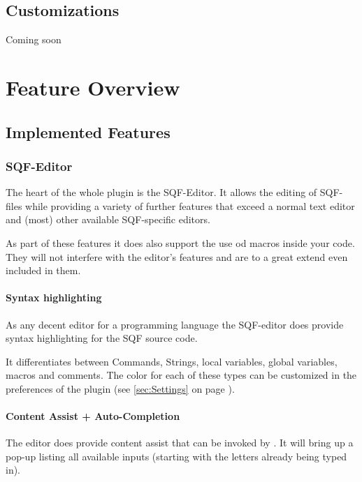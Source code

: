 \documentclass[twoside=false]{scrbook}
\begin{document}
	
	\section{Customizations}
	Coming soon
	
	
	
	\chapter{Feature Overview}
	\label{ch:FeatureOverview}
	
	\section{Implemented Features}
	\label{sec:Features}
	
	\subsection{SQF-Editor}
	\label{ssec:SQF-Editor}
	
	The heart of the whole plugin is the SQF-Editor. It allows the editing of SQF-files while providing a variety of further features that exceed a normal text editor and (most) other available SQF-specific editors.
	
	As part of these features it does also support the use od macros inside your code. They will not interfere with the editor's features and are to a great extend even included in them.
	
	
	\subsubsection{Syntax highlighting}
	As any decent editor for a programming language the SQF-editor does provide syntax highlighting for the SQF source code.
	
	It differentiates between Commands, Strings, local variables, global variables, macros and comments. The color for each of these types can be customized in the preferences of the plugin (see \ref{sec:Settings} on page \pageref{sec:Settings}).
	
	
	\subsubsection{Content Assist + Auto-Completion}
	The editor does provide content assist that can be invoked by . It will bring up a pop-up listing all available inputs (starting with the letters already being typed in).
	
\end{document}
